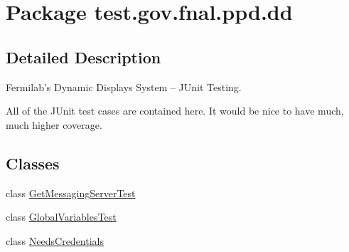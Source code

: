 \hypertarget{namespacetest_1_1gov_1_1fnal_1_1ppd_1_1dd}{\section{Package test.\-gov.\-fnal.\-ppd.\-dd}
\label{namespacetest_1_1gov_1_1fnal_1_1ppd_1_1dd}
}


\subsection{Detailed Description}
Fermilab's Dynamic Displays System -- J\-Unit Testing.

All of the J\-Unit test cases are contained here. It would be nice to have much, much higher coverage.\subsection*{Classes}
\begin{DoxyCompactItemize}
\item 
class \hyperlink{classtest_1_1gov_1_1fnal_1_1ppd_1_1dd_1_1GetMessagingServerTest}{Get\-Messaging\-Server\-Test}
\item 
class \hyperlink{classtest_1_1gov_1_1fnal_1_1ppd_1_1dd_1_1GlobalVariablesTest}{Global\-Variables\-Test}
\item 
class \hyperlink{classtest_1_1gov_1_1fnal_1_1ppd_1_1dd_1_1NeedsCredentials}{Needs\-Credentials}
\end{DoxyCompactItemize}
